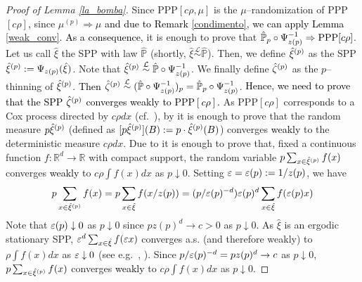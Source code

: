 \documentclass[12pt,a4paper,reqno]{amsart}
\newcommand{\cL}{\ensuremath{\mathcal L}}
\newcommand{\bbP}{{\ensuremath{\mathbb P}} }
\newcommand{\bbR}{{\ensuremath{\mathbb R}} }
\let\O=\Omega \let\P=\Pi   \let\Ps=\Psi \let\Si=\Sigma \let\X=\Xi
\newcommand{\rosso}{\textcolor{black}} %
\newcommand{\da}{\downarrow}
\newcommand{\be}{\begin{equation}}
\newcommand{\en}{\end{equation}}
\begin{document}
\begin{proof}[Proof of Lemma \ref{la_bomba}]
Since {\rm PPP}$[c \rho,\mu]$ is the $\mu$--randomization of {\rm PPP}$[c\rho]$\rosso{,} since 
$\mu^{(p)}\Rightarrow  \mu$ \rosso{and due to Remark \ref{condimento}, we can apply   Lemma \ref{weak_conv}. As a consequence,} it is enough to prove that  $ \hat \bbP_p \circ \Psi_{z(p)}  ^{-1}\Rightarrow {\rm PPP}[c \rho]$.
 Let us call $\hat \xi$ the SPP  with law $\hat\bbP$ (shortly, $\hat \xi \stackrel{\cL}{\sim} \hat \bbP$).
 Then, we define $\rosso{\hat \xi}^{(p)}$ as the SPP  $\rosso{\hat \xi}^{(p)}:= \Psi_{z(p) } (\hat \xi)$.  Note that $\rosso{\hat \xi}^{(p)} \stackrel{\cL}{\sim}  \hat \bbP\circ \Psi_{z(p)}  ^{-1}$. We finally define $\rosso{\hat \z}^{(p)}$ as the $p$--thinning of $\rosso{\hat \xi}^{(p)}$. \rosso{Then}
$\rosso{\hat  \z}^{(p)} \stackrel{\cL}{\sim}  (\hat \bbP\circ \Psi_{z(p)}  ^{-1})_p=\hat \bbP_p\circ \Psi_{z(p)}  ^{-1}$. \rosso{Hence, we need to prove that the SPP ${\hat{\zeta}}^{(p)}$  converges \rosso{weakly} to  {\rm PPP}$[c \rho]$.}
 As  {\rm PPP}$[c \rho]$ corresponds to a Cox process directed by $c  \rho dx$ (cf.~\cite[Chp.~12]{Kal}), by  \cite[Thm.~16.19]{Kal} it is enough to prove that the random measure  $p\rosso{\hat  \xi^{(p)} }$ (defined as $[p\rosso{\hat \xi}^{(p)} ](B):=p \cdot \rosso{\hat \xi}^{(p)}(B)$)  converges \rosso{weakly}  to the deterministic measure $c \rho dx$.  Due to \cite[Thm.~16.16]{Kal}  it is enough to prove that, fixed a continuous function $f:\bbR^d \to \bbR$ with compact support, the random variable \rosso{$p \sum _{x \in \rosso{\hat \xi}^{(p)} } f(x)$}  
  converges \rosso{weakly} to $c \rho \int f(x) dx$ as $p\downarrow 0$. Setting $\varepsilon=\varepsilon(p):= 1/z(p)$, we have 
 \[p \sum _{x \in \rosso{\hat \xi}^{(p)} } f(x) =
 p \sum_{x\in \hat \xi}  f( x/z(p) )=( p /\e(p)^{-d})  \e(p)^d   \sum_{x\in \hat \xi}  f(\e(p) x) 
\]
 Note that $\e (p) \da 0$ as $p\da 0$ since  $p z(p) ^d\to c>0$ as $p\da 0$. 
 As $\hat \xi$ is an ergodic stationary SPP,   $\varepsilon^d  \sum_{x\in \hat \xi} f(\varepsilon x)$ converges a.s. (and therefore weakly) to $\rho \int f(x) dx$  as $\e\da 0$ (see e.g.~\cite[Prop.~3.1]{Fhom1},  \cite{T}). Since  $p /\varepsilon(p)^{-d}=p z(p) ^d\to c$ as $p\downarrow 0$,  $p \sum _{x \in \rosso{\hat \xi}^{(p)} } f(x) $  converges  \rosso{weakly} to $c \rho \int f(x) dx$ as $p\downarrow 0$.
 \end{proof}
 
\end{document}
